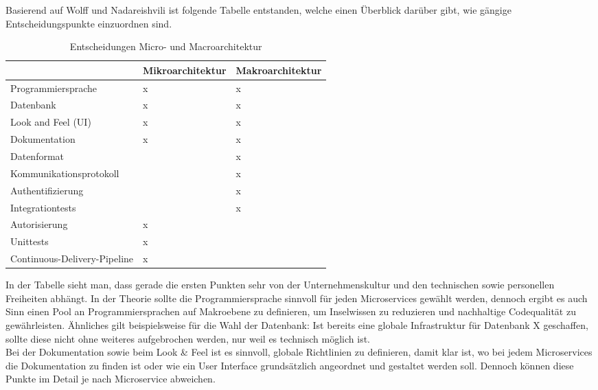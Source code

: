 Basierend auf Wolff und Nadareishvili ist folgende Tabelle entstanden, welche einen Überblick darüber gibt, wie gängige Entscheidungspunkte einzuordnen sind. \cite{wolff2018mic_praxis}\cite{irakli2016mic_arc}\cite{rewe2019mic_ppp}

\begin{table}
	\begin{center}
		\begin{tabular}{p{5cm}p{5cm}p{5cm}}
			& Mikroarchitektur & Makroarchitektur \\ \hline
			Programmiersprache &  x & x  \\
			Datenbank & x & x \\
			Look and Feel (UI) & x  & x  \\
			Dokumentation & x & x  \\
			Datenformat &   & x \\
			Kommunikationsprotokoll &   & x \\
			Authentifizierung &  & x \\
			Integrationtests &  &  x \\
			Autorisierung & x  &  \\
			Unittests & x  &  \\
			Continuous-Delivery-Pipeline & x &  \\
		\end{tabular}
	\end{center}
	\caption[Entscheidungen Micro- und Macroarchitektur]{Entscheidungen Micro- und Macroarchitektur}
\end{table}

In der Tabelle sieht man, dass gerade die ersten Punkten sehr von der Unternehmenskultur und den technischen sowie personellen Freiheiten abhängt. In der Theorie sollte die Programmiersprache sinnvoll für jeden Microservices gewählt werden, dennoch ergibt es auch Sinn einen Pool an Programmiersprachen auf Makroebene zu definieren, um Inselwissen zu reduzieren und nachhaltige Codequalität zu gewährleisten. Ähnliches gilt beispielsweise für die Wahl der Datenbank: Ist bereits eine globale Infrastruktur für Datenbank X geschaffen, sollte diese nicht ohne weiteres aufgebrochen werden, nur weil es technisch möglich ist. \\

Bei der Dokumentation sowie beim Look \& Feel ist es sinnvoll, globale Richtlinien zu definieren, damit klar ist, wo bei jedem Microservices die Dokumentation zu finden ist oder wie ein User Interface grundsätzlich angeordnet und gestaltet werden soll. Dennoch können diese Punkte im Detail je nach Microservice abweichen. \\

